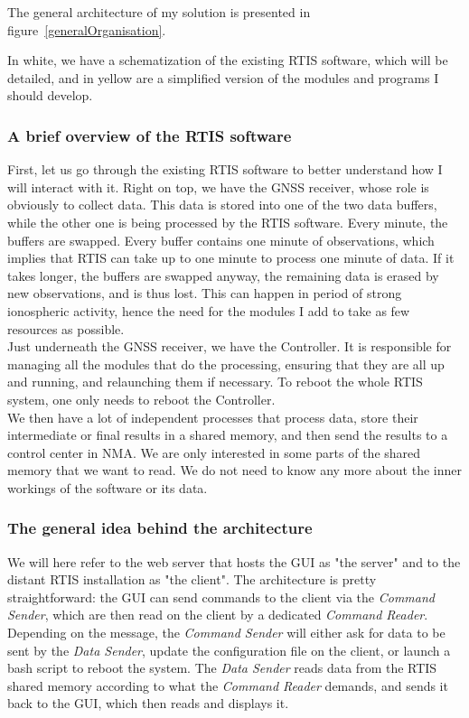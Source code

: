 \documentclass{themeensg}
\begin{document}
The general architecture of my solution is presented in figure~\ref{generalOrganisation}.

In white, we have a schematization of the existing RTIS software, which will be detailed, and in yellow are a simplified version of the modules and programs I should develop.

\subsubsection{A brief overview of the RTIS software}

First, let us go through the existing RTIS software to better understand how I will interact with it. Right on top, we have the GNSS receiver, whose role is obviously to collect data. This data is stored into one of the two data buffers, while the other one is being processed by the RTIS software. Every minute, the buffers are swapped. Every buffer contains one minute of observations, which implies that RTIS can take up to one minute to process one minute of data. If it takes longer, the buffers are swapped anyway, the remaining data is erased by new observations, and is thus lost. This can happen in period of strong ionospheric activity, hence the need for the modules I add to take as few resources as possible.\\

Just underneath the GNSS receiver, we have the Controller. It is responsible for managing all the modules that do the processing, ensuring that they are all up and running, and relaunching them if necessary. To reboot the whole RTIS system, one only needs to reboot the Controller.\\

We then have a lot of independent processes that process data, store their intermediate or final results in a shared memory, and then send the results to a control center in NMA. We are only interested in some parts of the shared memory that we want to read. We do not need to know any more about the inner workings of the software or its data.

\subsubsection{The general idea behind the architecture}

We will here refer to the web server that hosts the GUI as "the server" and to the distant RTIS installation as "the client".
The architecture is pretty straightforward: the GUI can send commands to the client via the \textit{Command Sender}, which are then read on the client by a dedicated \textit{Command Reader}. Depending on the message, the \textit{Command Sender} will either ask for data to be sent by the \textit{Data Sender}, update the configuration file on the client, or launch a bash script to reboot the system. The \textit{Data Sender} reads data from the RTIS shared memory according to what the \textit{Command Reader} demands, and sends it back to the GUI, which then reads and displays it.\\
\end{document}
